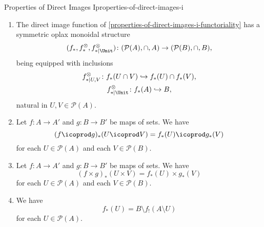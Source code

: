 \begin{proposition}{Properties of Direct Images I}{properties-of-direct-images-i}
\begin{enumerate}
            \[
                (f_{*},f^{\otimes}_{*},f^{\otimes}_{*|\Unit})
                \colon
                (\mathcal{P}(A),\cup,\emptyset)
                \to
                (\mathcal{P}(B),\cup,\emptyset),
            \]%
            being equipped with equalities%
            \[
                \begin{gathered}
                    f^{\otimes}_{*|U,V}   \colon f_{*}(U)\cup f_{*}(V) \rightequalsarrow f_{*}(U\cup V),\\
                    f^{\otimes}_{*|\Unit} \colon \emptyset             \rightequalsarrow \emptyset,
                \end{gathered}
            \]%
            natural in $U,V\in\mathcal{P}(A)$.
        \item\label{properties-of-direct-images-i-symmetric-oplax-monoidality-with-respect-to-intersections}The direct image function of \cref{properties-of-direct-images-i-functoriality} has a symmetric oplax monoidal structure
            \[
                (f_{*},f^{\otimes}_{*},f^{\otimes}_{*|\Unit})
                \colon
                (\mathcal{P}(A),\cap,A)
                \to
                (\mathcal{P}(B),\cap,B),
            \]%
            being equipped with inclusions%
            \[
                \begin{gathered}
                    f^{\otimes}_{*|U,V}   \colon f_{*}(U\cap V) \hookrightarrow f_{*}(U)\cap f_{*}(V),\\
                    f^{\otimes}_{*|\Unit} \colon f_{*}(A)       \hookrightarrow B,
                \end{gathered}
            \]%
            natural in $U,V\in\mathcal{P}(A)$.
        \item\label{properties-of-direct-images-i-interaction-with-coproducts}Let $f\colon A\to A'$ and $g\colon B\to B'$ be maps of sets. We have
            \[
                (f\icoprod g)_{*}(U\icoprod V)%
                =%
                f_{*}(U)\icoprod g_{*}(V)%
            \]%
            for each $U\in\mathcal{P}(A)$ and each $V\in\mathcal{P}(B)$.
        \item\label{properties-of-direct-images-i-interaction-with-products}Let $f\colon A\to A'$ and $g\colon B\to B'$ be maps of sets. We have
            \[
                (f\times g)_{*}(U\times V)%
                =%
                f_{*}(U)\times g_{*}(V)%
            \]%
            for each $U\in\mathcal{P}(A)$ and each $V\in\mathcal{P}(B)$.
        \item\label{properties-of-direct-images-i-relation-to-direct-images-with-compact-support}We have
            \[
                f_{*}(U)%
                =%
                B\setminus f_{!}(A\setminus U)
            \]%
            for each $U\in\mathcal{P}(A)$.
    \end{enumerate}
\end{proposition}

